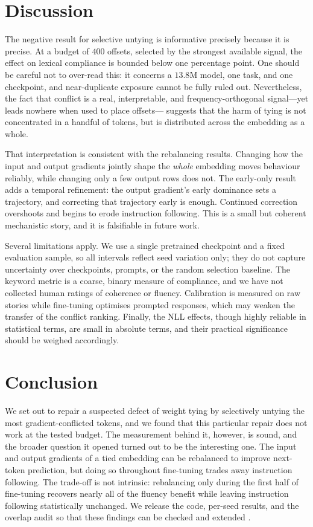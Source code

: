 \documentclass[conference]{IEEEtran}
\begin{document}
\section{Discussion}

The negative result for selective untying is informative precisely because it is
precise. At a budget of $400$ offsets, selected by the strongest available
signal, the effect on lexical compliance is bounded below one percentage point.
One should be careful not to over-read this: it concerns a $13.8$M model, one
task, and one checkpoint, and near-duplicate exposure cannot be fully ruled out.
Nevertheless, the fact that conflict is a real, interpretable, and
frequency-orthogonal signal---yet leads nowhere when used to place offsets---
suggests that the harm of tying is not concentrated in a handful of tokens, but
is distributed across the embedding as a whole.

That interpretation is consistent with the rebalancing results. Changing how the
input and output gradients jointly shape the \emph{whole} embedding moves
behaviour reliably, while changing only a few output rows does not. The
early-only result adds a temporal refinement: the output gradient's early
dominance sets a trajectory, and correcting that trajectory early is enough.
Continued correction overshoots and begins to erode instruction following. This
is a small but coherent mechanistic story, and it is falsifiable in future work.

Several limitations apply. We use a single pretrained checkpoint and a fixed
evaluation sample, so all intervals reflect seed variation only; they do not
capture uncertainty over checkpoints, prompts, or the random selection baseline.
The keyword metric is a coarse, binary measure of compliance, and we have not
collected human ratings of coherence or fluency. Calibration is measured on raw
stories while fine-tuning optimises prompted responses, which may weaken the
transfer of the conflict ranking. Finally, the NLL effects, though highly
reliable in statistical terms, are small in absolute terms, and their practical
significance should be weighed accordingly.

\section{Conclusion}

We set out to repair a suspected defect of weight tying by selectively untying
the most gradient-conflicted tokens, and we found that this particular repair
does not work at the tested budget. The measurement behind it, however, is
sound, and the broader question it opened turned out to be the interesting one.
The input and output gradients of a tied embedding can be rebalanced to improve
next-token prediction, but doing so throughout fine-tuning trades away
instruction following. The trade-off is not intrinsic: rebalancing only during
the first half of fine-tuning recovers nearly all of the fluency benefit while
leaving instruction following statistically unchanged. We release the code,
per-seed results, and the overlap audit so that these findings can be checked
and extended \cite{repo}.
\end{document}
